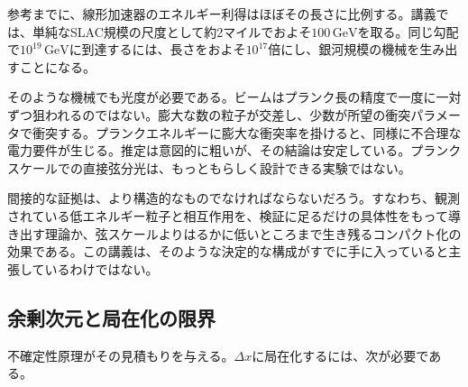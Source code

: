 参考までに、線形加速器のエネルギー利得はほぼその長さに比例する。講義では、単純なSLAC規模の尺度として約2マイルでおよそ\(100\,\mathrm{GeV}\)を取る。同じ勾配で\(10^{19}\,\mathrm{GeV}\)に到達するには、長さをおよそ\(10^{17}\)倍にし、銀河規模の機械を生み出すことになる。

そのような機械でも光度が必要である。ビームはプランク長の精度で一度に一対ずつ狙われるのではない。膨大な数の粒子が交差し、少数が所望の衝突パラメータで衝突する。プランクエネルギーに膨大な衝突率を掛けると、同様に不合理な電力要件が生じる。推定は意図的に粗いが、その結論は安定している。プランクスケールでの直接弦分光は、もっともらしく設計できる実験ではない。

間接的な証拠は、より構造的なものでなければならないだろう。すなわち、観測されている低エネルギー粒子と相互作用を、検証に足るだけの具体性をもって導き出す理論か、弦スケールよりはるかに低いところまで生き残るコンパクト化の効果である。この講義は、そのような決定的な構成がすでに手に入っていると主張しているわけではない。

\subsection{余剰次元と局在化の限界}

\begin{classroomqa}
\end{classroomqa}

\begin{classroomqa}
\end{classroomqa}

不確定性原理がその見積もりを与える。\(\Delta x\)に局在化するには、次が必要である。

\begin{classroomqa}
\end{classroomqa}

